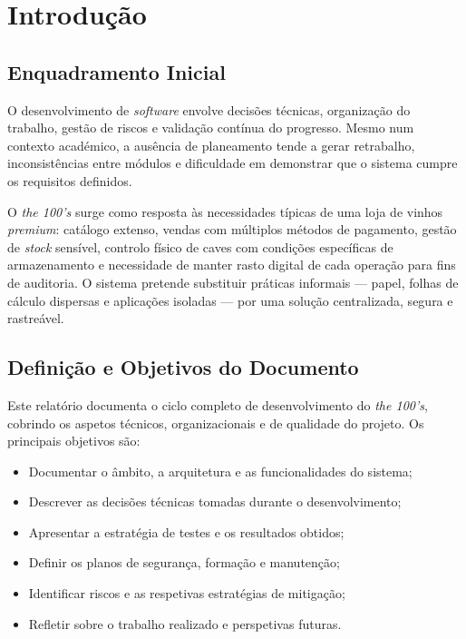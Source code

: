 \documentclass[11pt,a4paper]{report}
\begin{document}
\chapter{Introdução}

\section{Enquadramento Inicial}
O desenvolvimento de \textit{software} envolve decisões técnicas, organização do trabalho, gestão de riscos e validação contínua do progresso. Mesmo num contexto académico, a ausência de planeamento tende a gerar retrabalho, inconsistências entre módulos e dificuldade em demonstrar que o sistema cumpre os requisitos definidos.

O \textit{the 100's} surge como resposta às necessidades típicas de uma loja de vinhos \textit{premium}: catálogo extenso, vendas com múltiplos métodos de pagamento, gestão de \textit{stock} sensível, controlo físico de caves com condições específicas de armazenamento e necessidade de manter rasto digital de cada operação para fins de auditoria. O sistema pretende substituir práticas informais --- papel, folhas de cálculo dispersas e aplicações isoladas --- por uma solução centralizada, segura e rastreável.

\section{Definição e Objetivos do Documento}
Este relatório documenta o ciclo completo de desenvolvimento do \textit{the 100's}, cobrindo os aspetos técnicos, organizacionais e de qualidade do projeto. Os principais objetivos são:

\begin{itemize}
  \item Documentar o âmbito, a arquitetura e as funcionalidades do sistema;
  \item Descrever as decisões técnicas tomadas durante o desenvolvimento;
  \item Apresentar a estratégia de testes e os resultados obtidos;
  \item Definir os planos de segurança, formação e manutenção;
  \item Identificar riscos e as respetivas estratégias de mitigação;
  \item Refletir sobre o trabalho realizado e perspetivas futuras.
\end{itemize}
\end{document}
